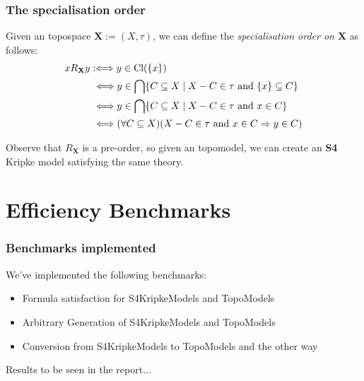 \documentclass[
	11pt, %
	aspectratio=1610, %
]{beamer}
\begin{document}
\begin{frame}
	\frametitle{The specialisation order}

	Given an topospace $\mathbf{X} := (X, \tau)$, we can define the \emph{specialisation order on $\mathbf{X}$} as follows:
	\begin{align*}
		xR_{\mathbf{X}}y &:\Longleftrightarrow y \in \text{Cl}(\{x\}) \\
		                 &~\Longleftrightarrow y \in \bigcap \{ C \subseteq X \mid  X-C \in \tau \text{ and } \{x\} \subseteq C \} \\
		                 &~\Longleftrightarrow y \in \bigcap \{ C \subseteq X \mid  X-C \in \tau \text{ and } x \in C \} \\
		                 &~\Longleftrightarrow (\forall C \subseteq X)(X-C \in \tau \text{ and } x \in C \Rightarrow y \in C)
	\end{align*}

	\bigskip

	Observe that $R_{\mathbf{X}}$ is a pre-order, so given an topomodel, we can create an \textbf{S4} Kripke model satisfying the same theory.

\end{frame}


\section{Efficiency Benchmarks}


\begin{frame}
	\frametitle{Benchmarks implemented}

	We've implemented the following benchmarks:

	\begin{itemize}
		\item Formula satisfaction for S4KripkeModels and TopoModels
		\item Arbitrary Generation of S4KripkeModels and TopoModels
		\item Conversion from S4KripkeModels to TopoModels and the other way
	\end{itemize}

	\bigskip\bigskip

	Results to be seen in the report...

\end{frame}

\end{document}

